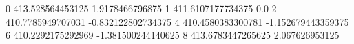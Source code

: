 0 413.528564453125 1.9178466796875
1 411.6107177734375 0.0
2 410.7785949707031 -0.832122802734375
4 410.4580383300781 -1.152679443359375
6 410.2292175292969 -1.381500244140625
8 413.6783447265625 2.067626953125
